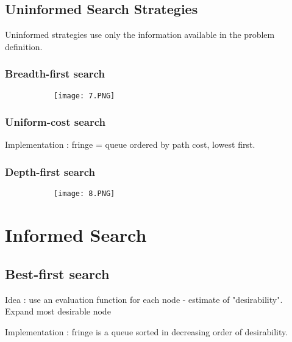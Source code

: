 \documentclass{article}
\begin{document}
\subsection{Uninformed Search Strategies}

Uninformed strategies use only the information available in the problem definition.

\subsubsection{Breadth-first search}


\begin{figure}[ht!]
  \centering
  \begin{subfigure}[b]{0.6\linewidth}
    \texttt{[image: 7.PNG]}
  \end{subfigure}
\end{figure}



\subsubsection{Uniform-cost search}

Implementation : fringe = queue ordered by path cost, lowest first. 

\subsubsection{Depth-first search}

\begin{figure}[ht!]
  \centering
  \begin{subfigure}[b]{0.6\linewidth}
    \texttt{[image: 8.PNG]}
  \end{subfigure}
\end{figure}

\section{Informed Search}

\subsection{Best-first search}

Idea : use an evaluation function for each node - estimate of "desirability". Expand most desirable node

Implementation : fringe is a queue sorted in decreasing order of desirability.
\end{document}
